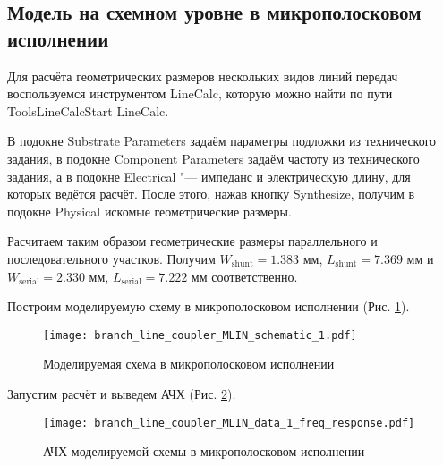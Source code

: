 \subsection{Модель на схемном уровне в микрополосковом исполнении}

Для расчёта геометрических размеров нескольких видов линий передач воспользуемся инструментом LineCalc, которую можно найти по пути Tools\textrightarrow LineCalc\textrightarrow Start LineCalc.

В подокне Substrate Parameters задаём параметры подложки из технического задания, в подокне Component Parameters задаём частоту из технического задания, а в подокне Electrical "--- импеданс и электрическую длину, для которых ведётся расчёт.
После этого, нажав кнопку Synthesize, получим в подокне Physical искомые геометрические размеры.

Расчитаем таким образом геометрические размеры параллельного и последовательного участков.
Получим $W_\text{shunt} = 1.383 \text{~мм}$, $L_\text{shunt} = 7.369 \text{~мм}$ и $W_\text{serial} = 2.330 \text{~мм}$, $L_\text{serial} = 7.222 \text{~мм}$ соответственно.

Построим моделируемую схему в микрополосковом исполнении (Рис. \ref{fig:branch_line_coupler_MLIN_schematic_1}).

\begin{figure}[!ht]
    \centering
    \texttt{[image: branch\_line\_coupler\_MLIN\_schematic\_1.pdf]}
    \caption{Моделируемая схема в микрополосковом исполнении}
    \label{fig:branch_line_coupler_MLIN_schematic_1}
\end{figure}

Запустим расчёт и выведем АЧХ (Рис. \ref{fig:branch_line_coupler_MLIN_data_1_freq_response}).

\begin{figure}[!ht]
    \centering
    \texttt{[image: branch\_line\_coupler\_MLIN\_data\_1\_freq\_response.pdf]}
    \caption{АЧХ моделируемой схемы в микрополосковом исполнении}
    \label{fig:branch_line_coupler_MLIN_data_1_freq_response}
\end{figure}

